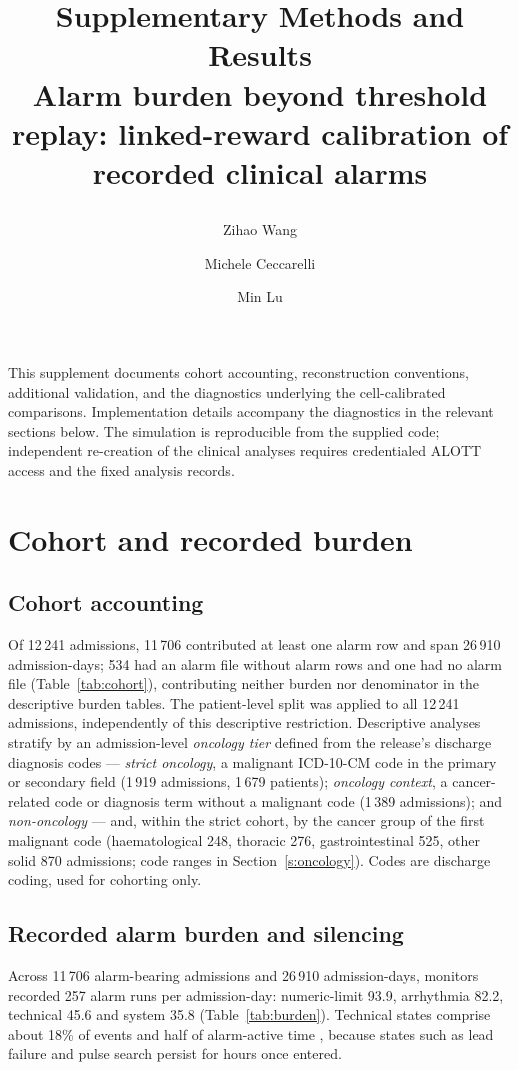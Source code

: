 \documentclass[11pt,letterpaper]{article}
\title{\bfseries Supplementary Methods and Results\\[5pt]\large
Alarm burden beyond threshold replay: linked-reward calibration of recorded clinical alarms

}
\author{Zihao Wang \and Michele Ceccarelli \and Min Lu}\date{}
\begin{document}
\maketitle
\noindent This supplement documents cohort accounting, reconstruction conventions, additional validation, and the diagnostics underlying the cell-calibrated comparisons. Implementation details accompany the diagnostics in the relevant sections below. The simulation is reproducible from the supplied code; independent re-creation of the clinical analyses requires credentialed ALOTT access and the fixed analysis records.
\setcounter{tocdepth}{1}\tableofcontents

\section{Cohort and recorded burden}\label{s:cohort}

\subsection{Cohort accounting}
Of 12\,241 admissions, 11\,706 contributed at least one alarm row and
span 26\,910 admission-days; 534 had an alarm file without alarm rows and one had no alarm file
(Table~\ref{tab:cohort}), contributing neither burden nor denominator in the descriptive burden tables. The patient-level split was applied to all 12\,241 admissions, independently of this descriptive restriction. Descriptive analyses stratify by an
admission-level \emph{oncology tier} defined from the release's
discharge diagnosis codes --- \emph{strict oncology}, a malignant ICD-10-CM code in the primary or
secondary field (1\,919 admissions, 1\,679 patients); \emph{oncology context}, a cancer-related code or
diagnosis term without a malignant code (1\,389 admissions); and \emph{non-oncology} --- and, within the
strict cohort, by the cancer group of the first malignant code (haematological 248, thoracic 276,
gastrointestinal 525, other solid 870 admissions; code ranges in Section~\ref{s:oncology}). Codes are discharge
coding, used for cohorting only.


\subsection{Recorded alarm burden and silencing}

Across 11\,706 alarm-bearing admissions and 26\,910 admission-days, monitors
recorded 257 alarm runs per admission-day: numeric-limit 93.9, arrhythmia
82.2, technical 45.6 and system 35.8 (Table~\ref{tab:burden}). Technical states
comprise about 18\% of events and half of alarm-active time
, because states such as lead failure and pulse
search persist for hours once entered.
\end{document}
